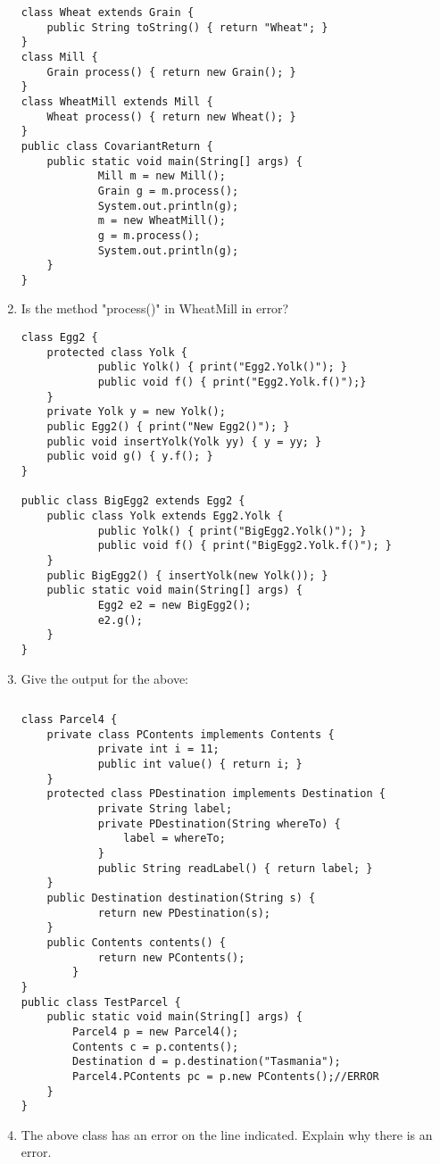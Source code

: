 \documentclass{article}
\begin{document}
\begin{enumerate}
\begin{lstlisting}
class Wheat extends Grain {
  	public String toString() { return "Wheat"; }
}
class Mill {
  	Grain process() { return new Grain(); }
}
class WheatMill extends Mill {
  	Wheat process() { return new Wheat(); }
}
public class CovariantReturn {
  	public static void main(String[] args) {
    		Mill m = new Mill();
    		Grain g = m.process();
    		System.out.println(g);
    		m = new WheatMill();
    		g = m.process();
    		System.out.println(g);
  	}
}
\end{lstlisting}
	\item Is the method "process()" in WheatMill in error?\newline
	\newpage
\begin{lstlisting}
class Egg2 {
  	protected class Yolk {   
    		public Yolk() { print("Egg2.Yolk()"); }       
    		public void f() { print("Egg2.Yolk.f()");}
  	}
  	private Yolk y = new Yolk();
  	public Egg2() { print("New Egg2()"); }
  	public void insertYolk(Yolk yy) { y = yy; }
  	public void g() { y.f(); }
} 

public class BigEgg2 extends Egg2 {
  	public class Yolk extends Egg2.Yolk {
    		public Yolk() { print("BigEgg2.Yolk()"); }
    		public void f() { print("BigEgg2.Yolk.f()"); }
  	}
  	public BigEgg2() { insertYolk(new Yolk()); }
  	public static void main(String[] args) {
    		Egg2 e2 = new BigEgg2();
    		e2.g();
  	}
}
\end{lstlisting}
	\item Give the output for the above:
\begin{lstlisting}
\end{lstlisting}
	\newpage
	
\begin{lstlisting}
class Parcel4 {
  	private class PContents implements Contents {
    		private int i = 11;
    		public int value() { return i; }
  	}
  	protected class PDestination implements Destination {
    		private String label;
    		private PDestination(String whereTo) {
      			label = whereTo;
    		}
    		public String readLabel() { return label; }
  	}
  	public Destination destination(String s) {
    		return new PDestination(s);
  	}
  	public Contents contents() {
    		return new PContents();
    	}
}
public class TestParcel {
	public static void main(String[] args) {
		Parcel4 p = new Parcel4();
		Contents c = p.contents();
		Destination d = p.destination("Tasmania");
		Parcel4.PContents pc = p.new PContents();//ERROR
  	}
}
\end{lstlisting}
	\item The above class has an error on the line indicated. Explain why there is an error.\newline
	\newpage
	

\end{enumerate}
\end{document}
